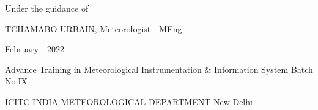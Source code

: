 \documentclass[a4papert,12pt]{report}%
\begin{document}
	\vspace{ 0.5\baselineskip}
\begin{center}	
	\Large {Under the guidance of}
\end{center}
	\vspace{ 0.0\baselineskip}
\begin{center}
	 \Large {TCHAMABO URBAIN, Meteorologist - MEng}
\end{center}
	 \vspace{ 1\baselineskip}
\begin{center}
	 \Large {February - 2022} 
\end{center}
	 \vspace{ 1\baselineskip}
\begin{center}
	\Large { Advance Training in Meteorological Instrumentation \& Information \newline System Batch No.IX}
\end{center}
	\vspace{ 0\baselineskip}
	
\begin{center}
	 \Large {ICITC \newline INDIA METEOROLOGICAL DEPARTMENT \newline New Delhi}
\end{center}


\setcounter{page}{1}



\newpage


\newpage

\tableofcontents

%



%



\end{document}
